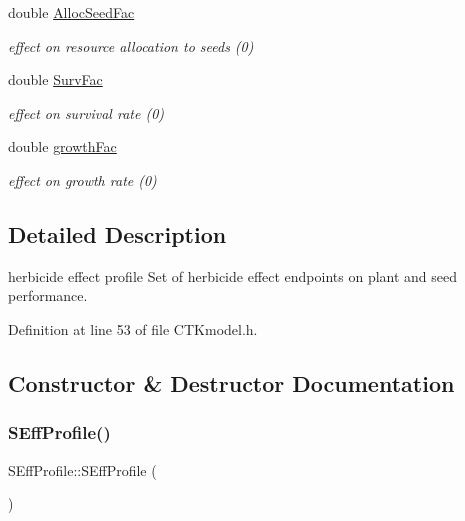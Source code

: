 \begin{DoxyCompactItemize}
\mbox{\label{struct_s_eff_profile_a97eefff1612223aa3d6b6ddb85be1dd0}} 
double \mbox{\hyperlink{struct_s_eff_profile_a97eefff1612223aa3d6b6ddb85be1dd0}{Alloc\+Seed\+Fac}}
\begin{DoxyCompactList}\small\item\em effect on resource allocation to seeds (0) \end{DoxyCompactList}\item 
\mbox{\label{struct_s_eff_profile_a9a8265694dead92b7c8a94572e37b833}} 
double \mbox{\hyperlink{struct_s_eff_profile_a9a8265694dead92b7c8a94572e37b833}{Surv\+Fac}}
\begin{DoxyCompactList}\small\item\em effect on survival rate (0) \end{DoxyCompactList}\item 
\mbox{\label{struct_s_eff_profile_a60585517fc98032d5318dff6ee0caf26}} 
double \mbox{\hyperlink{struct_s_eff_profile_a60585517fc98032d5318dff6ee0caf26}{growth\+Fac}}
\begin{DoxyCompactList}\small\item\em effect on growth rate (0) \end{DoxyCompactList}\end{DoxyCompactItemize}


\subsection{Detailed Description}
herbicide effect profile Set of herbicide effect endpoints on plant and seed performance. 

Definition at line 53 of file C\+T\+Kmodel.\+h.



\subsection{Constructor \& Destructor Documentation}
\mbox{\label{struct_s_eff_profile_aed86adf4491dd80364149278a15d5ed4}} 
\subsubsection{\texorpdfstring{SEffProfile()}{SEffProfile()}\hspace{0.1cm}{\footnotesize\ttfamily [1/2]}}
{\footnotesize\ttfamily S\+Eff\+Profile\+::\+S\+Eff\+Profile (\begin{DoxyParamCaption}{ }\end{DoxyParamCaption})}



